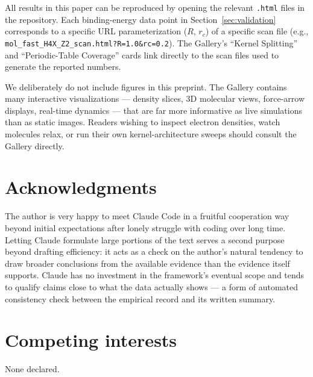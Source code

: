 \documentclass[11pt]{article}
\begin{document}
All results in this paper can be reproduced by opening the relevant \texttt{.html} files in the repository. Each binding-energy data point in Section~\ref{sec:validation} corresponds to a specific URL parameterization ($R$, $r_c$) of a specific scan file (e.g., \texttt{mol\_fast\_H4X\_Z2\_scan.html?R=1.0\&rc=0.2}). The Gallery's ``Kernel Splitting'' and ``Periodic-Table Coverage'' cards link directly to the scan files used to generate the reported numbers.

We deliberately do not include figures in this preprint. The Gallery contains many interactive visualizations --- density slices, 3D molecular views, force-arrow displays, real-time dynamics --- that are far more informative as live simulations than as static images. Readers wishing to inspect electron densities, watch molecules relax, or run their own kernel-architecture sweeps should consult the Gallery directly.

\section*{Acknowledgments}

The author is very happy to meet Claude Code in a fruitful cooperation way beyond initial expectations after lonely struggle with coding over long time. Letting Claude formulate large portions of the text serves a second purpose beyond drafting efficiency: it acts as a check on the author's natural tendency to draw broader conclusions from the available evidence than the evidence itself supports. Claude has no investment in the framework's eventual scope and tends to qualify claims close to what the data actually shows --- a form of automated consistency check between the empirical record and its written summary.

\section*{Competing interests}

None declared.
\end{document}
